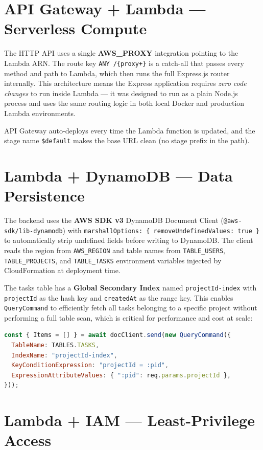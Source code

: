 \documentclass[12pt,a4paper]{report}
\begin{document}
\section{API Gateway + Lambda — Serverless Compute}

The HTTP API uses a single \textbf{AWS\_PROXY} integration pointing to the Lambda ARN.
The route key \texttt{ANY /\{proxy+\}} is a catch-all that passes every method and path
to Lambda, which then runs the full Express.js router internally. This architecture
means the Express application requires \emph{zero code changes} to run inside Lambda —
it was designed to run as a plain Node.js process and uses the same routing logic in
both local Docker and production Lambda environments.

API Gateway auto-deploys every time the Lambda function is updated, and the stage name
\texttt{\$default} makes the base URL clean (no stage prefix in the path).

\section{Lambda + DynamoDB — Data Persistence}

The backend uses the \textbf{AWS SDK v3} DynamoDB Document Client
(\texttt{@aws-sdk/lib-dynamodb}) with \texttt{marshallOptions: \{ removeUndefinedValues: true \}}
to automatically strip undefined fields before writing to DynamoDB. The client reads
the region from \texttt{AWS\_REGION} and table names from \texttt{TABLE\_USERS},
\texttt{TABLE\_PROJECTS}, and \texttt{TABLE\_TASKS} environment variables injected by
CloudFormation at deployment time.

The tasks table has a \textbf{Global Secondary Index} named \texttt{projectId-index}
with \texttt{projectId} as the hash key and \texttt{createdAt} as the range key. This
enables \texttt{QueryCommand} to efficiently fetch all tasks belonging to a specific
project without performing a full table scan, which is critical for performance and
cost at scale:

\begin{lstlisting}[language=JavaScript, caption={GSI Query for project-scoped task retrieval (tasks.js)}]
const { Items = [] } = await docClient.send(new QueryCommand({
  TableName: TABLES.TASKS,
  IndexName: "projectId-index",
  KeyConditionExpression: "projectId = :pid",
  ExpressionAttributeValues: { ":pid": req.params.projectId },
}));
\end{lstlisting}

\section{Lambda + IAM — Least-Privilege Access}
\end{document}
